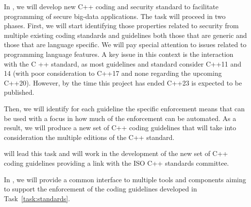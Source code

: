 \begin{Workpackage}{\thewpno}
\begin{Task}
	In \theTask, we will develop new C++ coding and security standard to facilitate programming of secure big-data applications. The task will proceed in two phases. 
First, we will start identifying those properties related to security from multiple existing coding standards and guidelines both those that are generic and those that are language specific. We will pay special attention to issues related to programming language features. A key issue in this context is the interaction with the C
++ standard, as most guidelines and standard consider C++11 and 14 (with poor consideration to C++17 and none regarding the upcoming C++20). However, by the time this project has ended C++23 is expected to be published.

Then, we will identify for each guideline the specific enforcement means that can be used with a focus in how much of the enforcement can be automated. As a result, we will produce a new set of C++ coding guidelines that will take into consideration the multiple editions of the C++ standard.

\UCM will lead this task and will work in the development of the new set of C++ coding guidelines providing a link with the ISO C++ standards committee.

\end{Task}

\begin{Task}


	\TaskResults{%
	}
	\TaskHeader{}
	
	In \theTask, we will provide a common interface to multiple tools
        and components aiming to support the enforcement of the coding
        guidelines developed in Task~\ref{task:standards}.
        

\end{Task}
\end{Workpackage}
